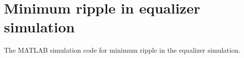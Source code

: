 \chapter{Minimum ripple in equalizer simulation}\label{app:equalizer}

The MATLAB simulation code for minimum ripple in the equalizer simulation. 



